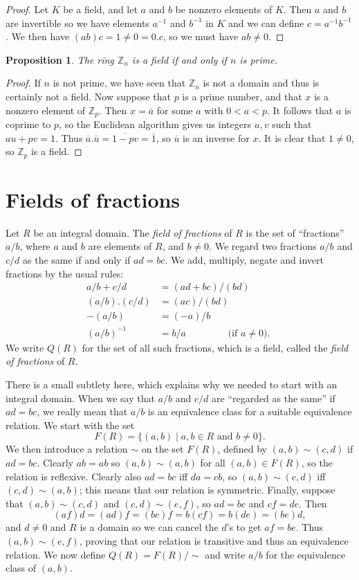 \documentclass{amsart}
\newcommand{\Z}         {{\mathbb{Z}}}
\newcommand{\st}        {\;|\;}
\newcommand{\ov}[1]     {\overline{#1}}
\renewcommand{\:}{\colon}
\newtheorem{proposition}[theorem]{Proposition}
\theoremstyle{definition}
\begin{document}
\begin{proof}
 Let $K$ be a field, and let $a$ and $b$ be nonzero elements of $K$.
 Then $a$ and $b$ are invertible so we have elements $a^{-1}$ and
 $b^{-1}$ in $K$ and we can define $c=a^{-1}b^{-1}$.  We then have
 $(ab)c=1\neq 0=0.c$, so we must have $ab\neq 0$.
\end{proof}
\begin{proposition}
 The ring $\Z_n$ is a field if and only if $n$ is prime.
\end{proposition}
\begin{proof}
 If $n$ is not prime, we have seen that $\Z_n$ is not a domain and
 thus is certainly not a field.  Now suppose that $p$ is a prime
 number, and that $x$ is a nonzero element of $\Z_p$.  Then $x=\ov{a}$
 for some $a$ with $0<a<p$.  It follows that $a$ is coprime to $p$, so
 the Euclidean algorithm gives us integers $u,v$ such that $au+pv=1$.
 Thus $\ov{a}.\ov{u}=\ov{1-pv}=\ov{1}$, so $\ov{u}$ is an inverse for
 $x$.  It is clear that $1\neq 0$, so $\Z_p$ is a field.
\end{proof}

\section{Fields of fractions}

Let $R$ be an integral domain.  The \emph{field of fractions} of $R$
is the set of ``fractions'' $a/b$, where $a$ and $b$ are elements of
$R$, and $b\neq 0$.  We regard two fractions $a/b$ and $c/d$ as the
same if and only if $ad=bc$.  We add, multiply, negate and invert
fractions by the usual rules:
\begin{align*}
 a/b + c/d &= (ad+bc)/(bd) \\
 (a/b).(c/d) &= (ac)/(bd) \\
 -(a/b) &= (-a)/b \\
 (a/b)^{-1} &= b/a \hspace{4em} \text{ (if $a\neq 0$). }
\end{align*}
We write $Q(R)$ for the set of all such fractions, which is a field,
called the \emph{field of fractions} of $R$.

There is a small subtlety here, which explains why we needed to start
with an integral domain.  When we say that $a/b$ and $c/d$ are
``regarded as the same'' if $ad=bc$, we really mean that $a/b$ is an
equivalence class for a suitable equivalence relation.  We start with
the set 
\[ F(R) = \{(a,b)\st a,b\in R \text{ and } b\neq 0\}. \]
We then introduce a relation $\sim$ on the set $F(R)$, defined by
$(a,b)\sim(c,d)$ if $ad=bc$.  Clearly $ab=ab$ so $(a,b)\sim(a,b)$ for
all $(a,b)\in F(R)$, so the relation is reflexive.  Clearly also
$ad=bc$ iff $da=cb$, so $(a,b)\sim(c,d)$ iff $(c,d)\sim(a,b)$; this
means that our relation is symmetric.  Finally, suppose that
$(a,b)\sim(c,d)$ and $(c,d)\sim(e,f)$, so $ad=bc$ and $cf=de$.  Then
\[ (af)d=(ad)f=(bc)f=b(cf)=b(de)=(be)d, \]
and $d\neq 0$ and $R$ is a domain so we can cancel the $d$'s to get
$af=be$.  Thus $(a,b)\sim(e,f)$, proving that our relation is
transitive and thus an equivalence relation.  We now define
$Q(R)=F(R)/\sim$ and write $a/b$ for the equivalence class of
$(a,b)$.  
\end{document}
